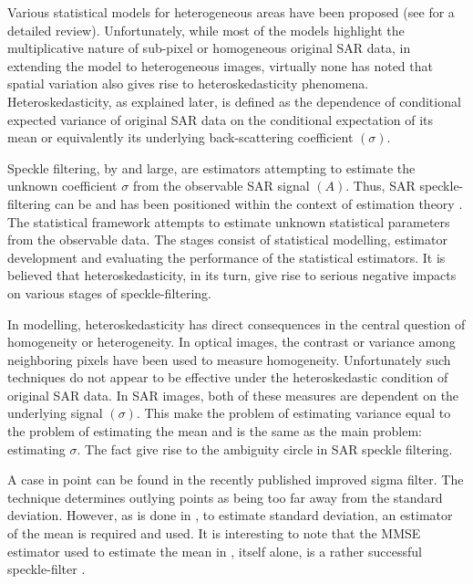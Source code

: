 Various statistical models for heterogeneous areas have been proposed (see \cite{Touzi_2002_TGRS} for a detailed review). 
Unfortunately, while most of the models highlight the multiplicative nature of sub-pixel or homogeneous original SAR data, in extending the model to heterogeneous images, virtually none has noted that spatial variation also gives rise to heteroskedasticity phenomena. 
Heteroskedasticity, as explained later, is defined as the dependence of conditional expected variance of original SAR data on the conditional expectation of its mean or equivalently its underlying back-scattering coefficient $(\sigma)$. 

Speckle filtering, by and large, are estimators attempting to estimate the unknown coefficient $\sigma$ from the observable SAR signal $(A)$. 
Thus, SAR speckle-filtering can be and has been positioned within the context of estimation theory \cite{Touzi_2002_TGRS}. 
The statistical framework attempts to estimate unknown statistical parameters from the observable data. 
The stages consist of statistical modelling, estimator development and evaluating the performance of the statistical estimators. 
It is believed that heteroskedasticity, in its turn, give rise to serious negative impacts on various stages of speckle-filtering. 

In modelling, heteroskedasticity has direct consequences in the central question of homogeneity or heterogeneity. 
In optical images, the contrast or variance among neighboring pixels have been used to measure homogeneity. 
Unfortunately such techniques do not appear to be effective under the heteroskedastic condition of original SAR data. 
In SAR images, both of these measures are dependent on the underlying signal $(\sigma)$. 
This make the problem of estimating variance equal to the problem of estimating the mean and is the same as the main problem: estimating $\sigma$. 
The fact give rise to the ambiguity circle in SAR speckle filtering.

A case in point can be found in the recently published improved sigma filter\cite{Lee_TGRS_2009}. 
The technique determines outlying points as being too far away from the standard deviation. 
However, as is done in \cite{Lee_TGRS_2009}, to estimate standard deviation, an estimator of the mean is required and used. 
It is interesting to note that the MMSE estimator used to estimate the mean in \cite{Lee_TGRS_2009}, itself alone, is a rather successful speckle-filter \cite{Lee_PAMI_1980}.

